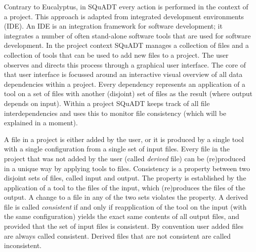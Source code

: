 \documentclass{article}
\newcommand{\squadt}{SQuADT\xspace}
\begin{document}
  
  Contrary to Eucalyptus, in \squadt every action is performed in the context
  of a project. This approach is adapted from integrated development
  environments (IDE).  An IDE is an integration framework for software
  development; it integrates a number of often stand-alone software tools that
  are used for software development. In the project context \squadt manages a
  collection of files and a collection of tools that can be used to add new
  files to a project. The user observes and directs this process through a
  graphical user interface.  The core of that user interface is focussed around
  an interactive visual overview of all data dependencies within a project.
  Every dependency represents an application of a tool on a set of files with
  another (disjoint) set of files as the result (where output depends on
  input).  Within a project \squadt keeps track of all file interdependencies
  and uses this to monitor file consistency (which will be explained in a moment).

  A file in a project is either added by the user, or it is produced by a
  single tool with a single configuration from a single set of input files.
  Every file in the project that was not added by the user (called
  \textit{derived} file) can be (re)produced in a unique way by applying tools
  to files. Consistency is a property between two disjoint sets of files,
  called input and output. The property is established by the application of a
  tool to the files of the input, which (re)produces the files of the output. A
  change to a file in any of the two sets violates the property. A derived file
  is called \textit{consistent} if and only if reapplication of the tool on the
  input (with the same configuration) yields the exact same contents of all
  output files, and provided that the set of input files is consistent. By
  convention user added files are always called consistent. Derived files that
  are not consistent are called inconsistent.
  
\end{document}
